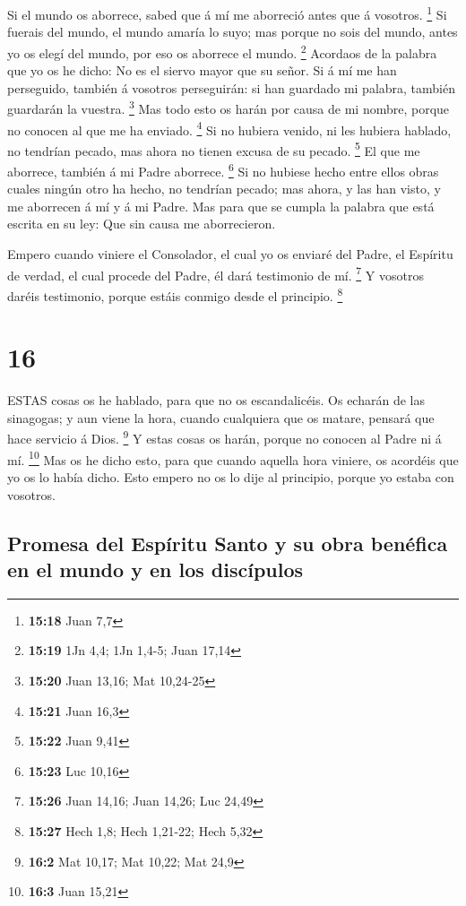  Si el mundo os aborrece, sabed que á mí me aborreció antes
que á vosotros. \footnote{\textbf{15:18} Juan 7,7}  Si
fuerais del mundo, el mundo amaría lo suyo; mas porque no sois del
mundo, antes yo os elegí del mundo, por eso os aborrece el mundo.
\footnote{\textbf{15:19} 1Jn 4,4; 1Jn 1,4-5; Juan 17,14} 
Acordaos de la palabra que yo os he dicho: No es el siervo mayor que su
señor. Si á mí me han perseguido, también á vosotros perseguirán: si han
guardado mi palabra, también guardarán la vuestra. \footnote{\textbf{15:20}
  Juan 13,16; Mat 10,24-25}  Mas todo esto os harán por
causa de mi nombre, porque no conocen al que me ha enviado. \footnote{\textbf{15:21}
  Juan 16,3}  Si no hubiera venido, ni les hubiera hablado,
no tendrían pecado, mas ahora no tienen excusa de su pecado. \footnote{\textbf{15:22}
  Juan 9,41}  El que me aborrece, también á mi Padre
aborrece. \footnote{\textbf{15:23} Luc 10,16}  Si no
hubiese hecho entre ellos obras cuales ningún otro ha hecho, no tendrían
pecado; mas ahora, y las han visto, y me aborrecen á mí y á mi Padre.
 Mas para que se cumpla la palabra que está escrita en su
ley: Que sin causa me aborrecieron.

 Empero cuando viniere el Consolador, el cual yo os enviaré
del Padre, el Espíritu de verdad, el cual procede del Padre, él dará
testimonio de mí. \footnote{\textbf{15:26} Juan 14,16; Juan 14,26; Luc
  24,49}  Y vosotros daréis testimonio, porque estáis
conmigo desde el principio. \footnote{\textbf{15:27} Hech 1,8; Hech
  1,21-22; Hech 5,32}

\hypertarget{section-15}{%
\section{16}\label{section-15}}

 ESTAS cosas os he hablado, para que no os escandalicéis.
 Os echarán de las sinagogas; y aun viene la hora, cuando
cualquiera que os matare, pensará que hace servicio á Dios. \footnote{\textbf{16:2}
  Mat 10,17; Mat 10,22; Mat 24,9}  Y estas cosas os harán,
porque no conocen al Padre ni á mí. \footnote{\textbf{16:3} Juan 15,21}
 Mas os he dicho esto, para que cuando aquella hora viniere,
os acordéis que yo os lo había dicho. Esto empero no os lo dije al
principio, porque yo estaba con vosotros.

\hypertarget{promesa-del-espuxedritu-santo-y-su-obra-benuxe9fica-en-el-mundo-y-en-los-discuxedpulos}{%
\subsection{Promesa del Espíritu Santo y su obra benéfica en el mundo y
en los
discípulos}\label{promesa-del-espuxedritu-santo-y-su-obra-benuxe9fica-en-el-mundo-y-en-los-discuxedpulos}}

